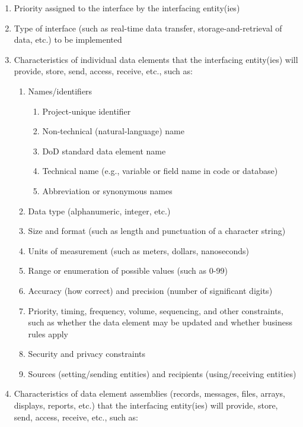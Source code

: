 \begin{enumerate}
\itemsep1pt\parskip0pt
\item
  Priority assigned to the interface by the interfacing entity(ies)
\item
  Type of interface (such as real-time data transfer,
  storage-and-retrieval of data, etc.) to be implemented
\item
  Characteristics of individual data elements that the interfacing
  entity(ies) will provide, store, send, access, receive, etc., such as:

  \begin{enumerate}
  \itemsep1pt\parskip0pt
  \item
    Names/identifiers

    \begin{enumerate}
    \itemsep1pt\parskip0pt
    \item
      Project-unique identifier
    \item
      Non-technical (natural-language) name
    \item
      DoD standard data element name
    \item
      Technical name (e.g., variable or field name in code or database)
    \item
      Abbreviation or synonymous names
    \end{enumerate}
  \item
    Data type (alphanumeric, integer, etc.)
  \item
    Size and format (such as length and punctuation of a character
    string)
  \item
    Units of measurement (such as meters, dollars, nanoseconds)
  \item
    Range or enumeration of possible values (such as 0-99)
  \item
    Accuracy (how correct) and precision (number of significant digits)
  \item
    Priority, timing, frequency, volume, sequencing, and other
    constraints, such as whether the data element may be updated and
    whether business rules apply
  \item
    Security and privacy constraints
  \item
    Sources (setting/sending entities) and recipients (using/receiving
    entities)
  \end{enumerate}
\item
  Characteristics of data element assemblies (records, messages, files,
  arrays, displays, reports, etc.) that the interfacing entity(ies) will
  provide, store, send, access, receive, etc., such as:


\end{enumerate}
